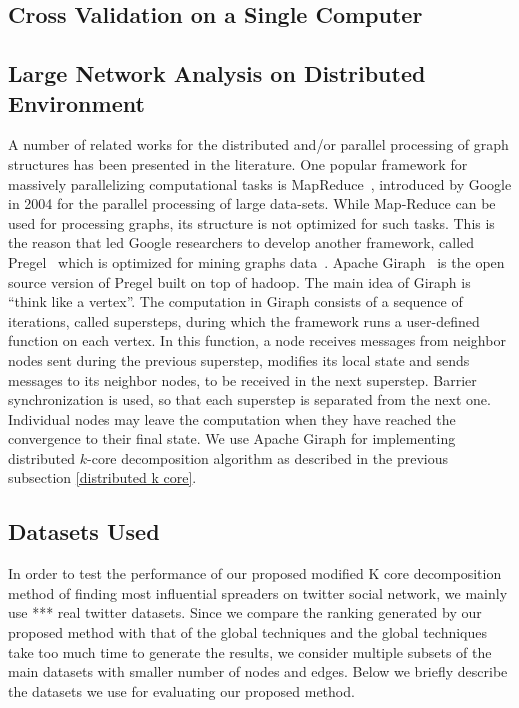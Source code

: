 \documentclass[sigconf]{acmart}
\begin{document}
\subsection{Cross Validation on a Single Computer}


\subsection{Large Network Analysis on Distributed Environment}
A number of related works for the distributed and/or parallel processing of graph structures has been presented in the literature. One popular framework for massively parallelizing
computational tasks is MapReduce~\cite{dean2008mapreduce}, introduced by Google in 2004 for the parallel processing of large data-sets. While Map-Reduce can be used for processing graphs, its structure is not optimized for such tasks. This is the reason that led Google researchers to develop another framework, called Pregel~\cite{malewicz2010pregel} which is optimized for mining graphs data~\cite{han2014experimental}. Apache Giraph~\cite{martella2012apache,martella2015practical} is the open source version of Pregel built on top of hadoop. The main idea of Giraph is ``think like a vertex''. The computation in Giraph consists of a sequence of iterations, called supersteps, during which the framework runs a user-defined function on each vertex. In this function, a node receives messages from neighbor nodes sent during the previous superstep, modifies its local state and sends messages to its neighbor nodes, to be received in the next superstep. Barrier synchronization is used, so that each superstep is separated from the next one. Individual nodes may leave the computation when they have reached the convergence to their final state.
We use Apache Giraph for implementing distributed $k$-core decomposition algorithm as described in the previous subsection \ref{distributed k core}.


\subsection{Datasets Used}
In order to test the performance of our proposed modified K core decomposition method of finding most influential spreaders on twitter social network, we mainly use *** real twitter datasets. Since we compare the ranking generated by our proposed method with that of the global techniques and the global techniques take too much time to generate the results, we consider multiple subsets of the main datasets with smaller number of nodes and edges. Below we briefly describe the datasets we use for evaluating our proposed method.
\end{document}
